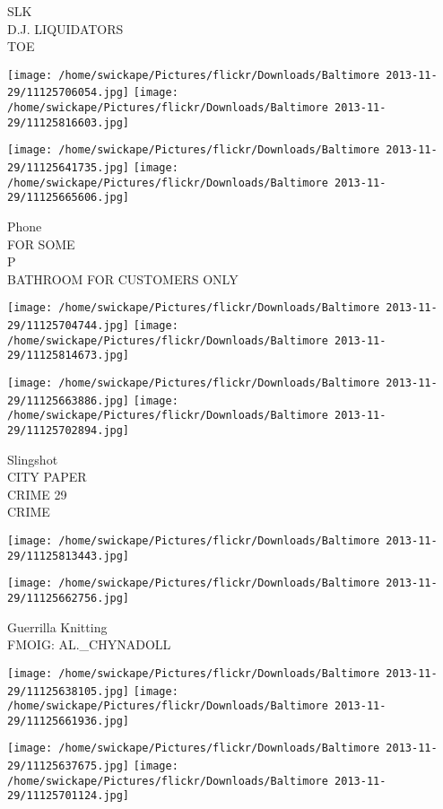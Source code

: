 \documentclass[10pt,letterpaper]{article}
\begin{document}
SLK\\
D.J. LIQUIDATORS\\
TOE
\pagebreak

\texttt{[image: /home/swickape/Pictures/flickr/Downloads/Baltimore 2013-11-29/11125706054.jpg]}
\texttt{[image: /home/swickape/Pictures/flickr/Downloads/Baltimore 2013-11-29/11125816603.jpg]}

\texttt{[image: /home/swickape/Pictures/flickr/Downloads/Baltimore 2013-11-29/11125641735.jpg]}
\texttt{[image: /home/swickape/Pictures/flickr/Downloads/Baltimore 2013-11-29/11125665606.jpg]}

Phone\\
FOR SOME\\
P\\
BATHROOM FOR CUSTOMERS ONLY
\pagebreak

\texttt{[image: /home/swickape/Pictures/flickr/Downloads/Baltimore 2013-11-29/11125704744.jpg]}
\texttt{[image: /home/swickape/Pictures/flickr/Downloads/Baltimore 2013-11-29/11125814673.jpg]}

\texttt{[image: /home/swickape/Pictures/flickr/Downloads/Baltimore 2013-11-29/11125663886.jpg]}
\texttt{[image: /home/swickape/Pictures/flickr/Downloads/Baltimore 2013-11-29/11125702894.jpg]}

Slingshot\\
CITY PAPER\\
CRIME 29\\
CRIME
\pagebreak

\texttt{[image: /home/swickape/Pictures/flickr/Downloads/Baltimore 2013-11-29/11125813443.jpg]}

\vspace{0.25in}
\texttt{[image: /home/swickape/Pictures/flickr/Downloads/Baltimore 2013-11-29/11125662756.jpg]}

Guerrilla Knitting\\
FMOIG: AL.\_CHYNADOLL
\pagebreak

\texttt{[image: /home/swickape/Pictures/flickr/Downloads/Baltimore 2013-11-29/11125638105.jpg]}
\texttt{[image: /home/swickape/Pictures/flickr/Downloads/Baltimore 2013-11-29/11125661936.jpg]}

\texttt{[image: /home/swickape/Pictures/flickr/Downloads/Baltimore 2013-11-29/11125637675.jpg]}
\texttt{[image: /home/swickape/Pictures/flickr/Downloads/Baltimore 2013-11-29/11125701124.jpg]}
\end{document}
